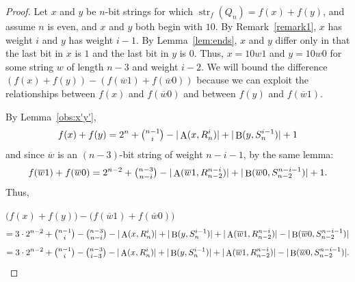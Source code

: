 \documentclass[12pt]{article}
\DeclareMathOperator{\str}{str}
\DeclareMathOperator{\Succ}{A}
\DeclareMathOperator{\Prec}{B}
\begin{document}
\begin{proof} Let $x$ and $y$ be $n$-bit strings for which $\str_f(Q_{n}) = f(x)+f(y)$, and assume $n$ is even, and $x$ and $y$ both begin with $10$.  By Remark~\ref{remark1}, $x$ has weight $i$ and $y$ has weight $i-1$.  By Lemma~\ref{lem:ends}, $x$ and $y$ differ only in that the last bit in $x$ is $1$ and the last bit in $y$ is $0$.  Thus, $x = 10w1$ and $y=10w0$ for some string $w$ of length $n-3$ and weight $i-2$.  We will bound the difference $(f(x)+f(y)) - (f(\overline{w}1)+f(\overline{w}0))$ because we can exploit the relationships between $f(x)$ and $f(\overline{w}0)$ and between $f(y)$ and $f(\overline{w}1)$.  

By Lemma~\ref{obs:x'y'}, $$f(x)+f(y) = 2^{n}+\tbinom{n-1}{i}-|\Succ(x,R_{n}^i)|+|\Prec(y,S_{n}^{i-1})|+1$$ and since $\overline{w}$ is an $(n-3)$-bit string of weight $n-i-1$, by the same lemma: $$f(\overline{w}1)+f(\overline{w}0)=2^{n-2} + \tbinom{n-3}{n-i}-|\Succ(\overline{w}1,R_{n-2}^{n-i})|+|\Prec(\overline{w}0,S_{n-2}^{n-i-1})|+1.$$  Thus,\medskip 

\noindent $\Big(f(x)+f(y)\Big) - \Big(f(\overline{w}1)+f(\overline{w}0)\Big)$ $$=3 \cdot 2^{n-2}+\tbinom{n-1}{i}-\tbinom{n-3}{n-i} -|\Succ(x,R_{n}^i)|+|\Prec(y,S_{n}^{i-1})| +|\Succ(\overline{w}1,R_{n-2}^{n-i})|-|\Prec(\overline{w}0,S_{n-2}^{n-i-1})|$$ \begin{equation} =3 \cdot 2^{n-2} + \tbinom{n-1}{i}-\tbinom{n-3}{i-3}
-|\Succ(x,R_{n}^i)|+|\Prec(y,S_{n}^{i-1})|+|\Succ(\overline{w}1,R_{n-2}^{n-i})|-|\Prec(\overline{w}0,S_{n-2}^{n-i-1})|.
\label{eqtogether} \end{equation}

\bigskip


\end{proof}
\end{document}
